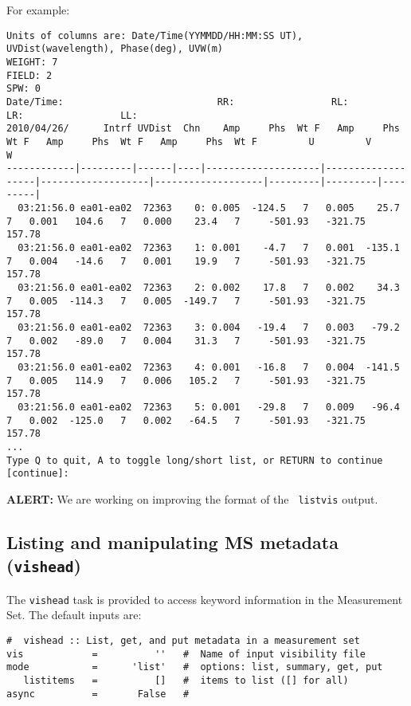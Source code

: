 For example:
\footnotesize
\begin{verbatim}
Units of columns are: Date/Time(YYMMDD/HH:MM:SS UT), UVDist(wavelength), Phase(deg), UVW(m)
WEIGHT: 7
FIELD: 2
SPW: 0
Date/Time:                           RR:                 RL:                 LR:                 LL:                                             
2010/04/26/      Intrf UVDist  Chn    Amp     Phs  Wt F   Amp     Phs  Wt F   Amp     Phs  Wt F   Amp     Phs  Wt F         U         V         W
------------|---------|------|----|--------------------|-------------------|-------------------|-------------------|---------|---------|---------|
  03:21:56.0 ea01-ea02  72363    0: 0.005  -124.5   7   0.005    25.7   7   0.001   104.6   7   0.000    23.4   7     -501.93   -321.75    157.78
  03:21:56.0 ea01-ea02  72363    1: 0.001    -4.7   7   0.001  -135.1   7   0.004   -14.6   7   0.001    19.9   7     -501.93   -321.75    157.78
  03:21:56.0 ea01-ea02  72363    2: 0.002    17.8   7   0.002    34.3   7   0.005  -114.3   7   0.005  -149.7   7     -501.93   -321.75    157.78
  03:21:56.0 ea01-ea02  72363    3: 0.004   -19.4   7   0.003   -79.2   7   0.002   -89.0   7   0.004    31.3   7     -501.93   -321.75    157.78
  03:21:56.0 ea01-ea02  72363    4: 0.001   -16.8   7   0.004  -141.5   7   0.005   114.9   7   0.006   105.2   7     -501.93   -321.75    157.78
  03:21:56.0 ea01-ea02  72363    5: 0.001   -29.8   7   0.009   -96.4   7   0.002  -125.0   7   0.002   -64.5   7     -501.93   -321.75    157.78
...
Type Q to quit, A to toggle long/short list, or RETURN to continue [continue]: 

\end{verbatim}
\normalsize

{\bf ALERT:} We are working on improving the format of the {\tt
  listvis} output.


\subsection{Listing and manipulating MS metadata ({\tt vishead})}
\label{section:io.vis.vishead}

The {\tt vishead} task is provided to access keyword information in
the Measurement Set.  The default inputs are:
\small
\begin{verbatim}
#  vishead :: List, get, and put metadata in a measurement set
vis            =          ''   #  Name of input visibility file
mode           =      'list'   #  options: list, summary, get, put
   listitems   =          []   #  items to list ([] for all)
async          =       False   #  
\end{verbatim}
\normalsize

